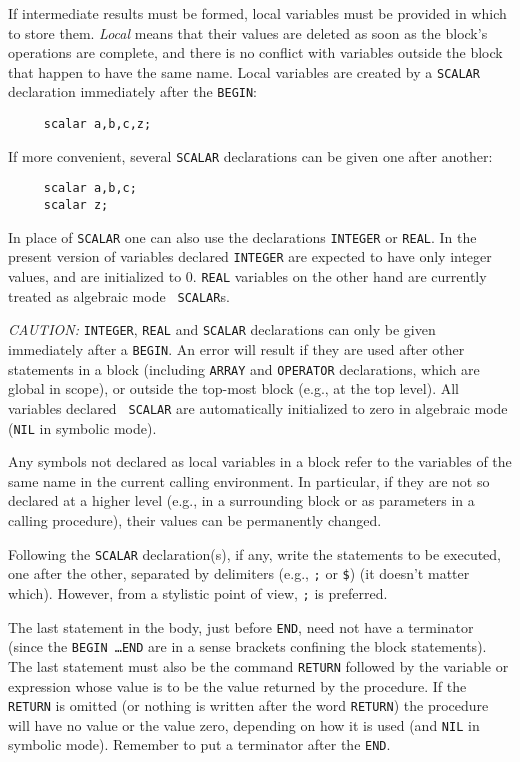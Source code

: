If intermediate results must be formed, local variables must be provided
in which to store them. {\em Local} means that their values are deleted as
soon as the block's operations are complete, and there is no conflict with
variables outside the block that happen to have the same name.  Local
variables are created by a {\tt SCALAR} declaration
immediately after the {\tt BEGIN}:
\begin{verbatim}
     scalar a,b,c,z;
\end{verbatim}
If more convenient, several {\tt SCALAR} declarations can be given one after
another:
\begin{verbatim}
     scalar a,b,c;
     scalar z;
\end{verbatim}
In place of {\tt SCALAR} one can also use the declarations
{\tt INTEGER} or {\tt REAL}.  In the present
version of {\REDUCE} variables declared {\tt INTEGER} are expected to have
only integer values, and are initialized to 0. {\tt REAL}
variables on the other hand are currently treated as algebraic mode {\tt
SCALAR}s.

{\it CAUTION:} {\tt INTEGER}, {\tt REAL} and {\tt SCALAR} declarations can
only be given immediately after a {\tt BEGIN}.  An error will result if
they are used after other statements in a block (including {\tt ARRAY} and
{\tt OPERATOR} declarations, which are global in scope), or outside the
top-most block (e.g., at the top level).  All variables declared {\tt
SCALAR} are automatically initialized to zero in algebraic mode ({\tt NIL}
in symbolic mode).

Any symbols not declared as local variables in a block refer to the
variables of the same name in the current calling environment. In
particular, if they are not so declared at a higher level (e.g., in a
surrounding block or as parameters in a calling procedure), their values can
be permanently changed.

Following the {\tt SCALAR} declaration(s), if any, write the
statements to be executed, one after the other, separated by delimiters
(e.g., {\tt ;} or {\tt \$}) (it doesn't matter which).  However, from a
stylistic point of view, {\tt ;} is preferred.

The last statement in the body, just before {\tt END}, need not have a
terminator (since the {\tt BEGIN \ldots END} are in a sense brackets
confining the block statements).  The last statement must also be the
command {\tt RETURN}  followed by the variable or
expression whose value is to be the value returned by the procedure.  If
the {\tt RETURN} is omitted (or nothing is written after the word
{\tt RETURN}) the procedure will have no value or the value zero, depending
on how it is used (and {\tt NIL} in symbolic mode).  Remember to put a
terminator after the {\tt END}.


